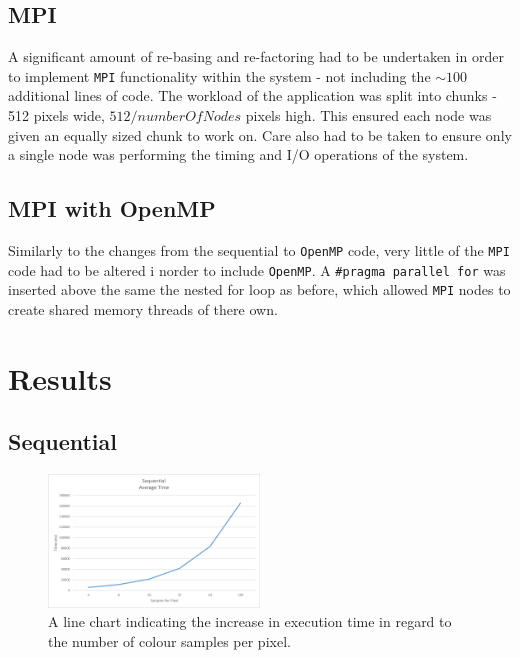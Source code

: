\documentclass[journal,transmag]{IEEEtran}
\begin{document}
	\subsection{MPI}
		A significant amount of re-basing and re-factoring had to be undertaken in order to implement \texttt{MPI} functionality within the system - not including the $\sim100$ additional lines of code. The workload of the application was split into chunks - 512 pixels wide, \(512 / number Of Nodes\) pixels high. This ensured each node was given an equally sized chunk to work on. Care also had to be taken to ensure only a single node was performing the timing and I/O operations of the system.
		
	\subsection{MPI with OpenMP}
		Similarly to the changes from the sequential to \texttt{OpenMP} code, very little of the \texttt{MPI} code had to be altered i norder to include \texttt{OpenMP}. A \texttt{\#pragma parallel for} was inserted above the same the nested for loop as before, which allowed \texttt{MPI} nodes to create shared memory threads of there own.
	
\section{Results}
	\lipsum[1]
	
	\subsection{Sequential}
			\lipsum[2]
		\begin{figure}[h]
			\centering
			\includegraphics[width = 0.5\textwidth]{chartSeqTime}
			\caption{A line chart indicating the increase in execution time in regard to the number of colour samples per pixel.}
			\label{fig_seq_time}
		\end{figure}
\end{document}
